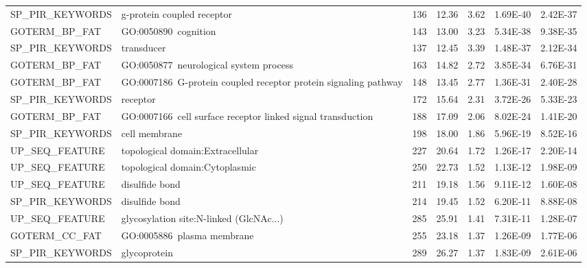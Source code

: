 \documentclass[a4paper,11pt,oneside]{book}
\begin{document}
{\begin{longtable}{lllllll}
SP\_PIR\_KEYWORDS & g-protein coupled receptor                                      & 136   & 12.36 & 3.62            & 1.69E-40 & 2.42E-37 \\
GOTERM\_BP\_FAT   & GO:0050890~cognition                                            & 143   & 13.00 & 3.23            & 5.34E-38 & 9.38E-35 \\
SP\_PIR\_KEYWORDS & transducer                                                      & 137   & 12.45 & 3.39            & 1.48E-37 & 2.12E-34 \\
GOTERM\_BP\_FAT   & GO:0050877~neurological system process                          & 163   & 14.82 & 2.72            & 3.85E-34 & 6.76E-31 \\
GOTERM\_BP\_FAT   & GO:0007186~G-protein coupled receptor protein signaling pathway & 148   & 13.45 & 2.77            & 1.36E-31 & 2.40E-28 \\
SP\_PIR\_KEYWORDS & receptor                                                        & 172   & 15.64 & 2.31            & 3.72E-26 & 5.33E-23 \\
GOTERM\_BP\_FAT   & GO:0007166~cell surface receptor linked signal transduction     & 188   & 17.09 & 2.06            & 8.02E-24 & 1.41E-20 \\
SP\_PIR\_KEYWORDS & cell membrane                                                   & 198   & 18.00 & 1.86            & 5.96E-19 & 8.52E-16 \\
UP\_SEQ\_FEATURE  & topological domain:Extracellular                                & 227   & 20.64 & 1.72            & 1.26E-17 & 2.20E-14 \\
UP\_SEQ\_FEATURE  & topological domain:Cytoplasmic                                  & 250   & 22.73 & 1.52            & 1.13E-12 & 1.98E-09 \\
UP\_SEQ\_FEATURE  & disulfide bond                                                  & 211   & 19.18 & 1.56            & 9.11E-12 & 1.60E-08 \\
SP\_PIR\_KEYWORDS & disulfide bond                                                  & 214   & 19.45 & 1.52            & 6.20E-11 & 8.88E-08 \\
UP\_SEQ\_FEATURE  & glycosylation site:N-linked (GlcNAc...)                         & 285   & 25.91 & 1.41            & 7.31E-11 & 1.28E-07 \\
GOTERM\_CC\_FAT   & GO:0005886~plasma membrane                                      & 255   & 23.18 & 1.37            & 1.26E-09 & 1.77E-06 \\
SP\_PIR\_KEYWORDS & glycoprotein                                                    & 289   & 26.27 & 1.37            & 1.83E-09 & 2.61E-06 \\

\end{longtable}}
\end{document}
